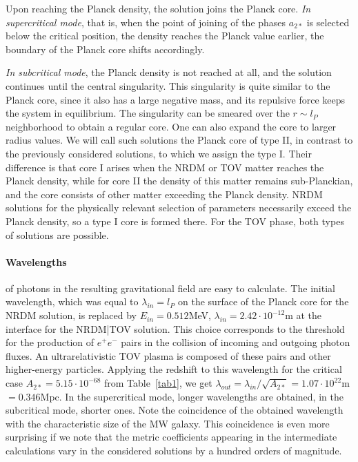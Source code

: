 \documentclass{article}
\begin{document}
Upon reaching the Planck density, the solution joins the Planck core. {\it In supercritical mode}, that is, when the point of joining of the phases $ a_ {2 *} $ is selected below the critical position, the density reaches the Planck value earlier, the boundary of the Planck core shifts accordingly.

{\it In subcritical mode}, the Planck density is not reached at all, and the solution continues until the central singularity. This singularity is quite similar to the Planck core, since it also has a large negative mass, and its repulsive force keeps the system in equilibrium. The singularity can be smeared over the $ r \sim l_P $ neighborhood to obtain a regular core. One can also expand the core to larger radius values. We will call such solutions the Planck core of type II, in contrast to the previously considered solutions, to which we assign the type I. Their difference is that core I arises when the NRDM or TOV matter reaches the Planck density, while for core II the density of this matter remains sub-Planckian, and the core consists of other matter exceeding the Planck density. NRDM solutions for the physically relevant selection of parameters necessarily exceed the Planck density, so a type I core is formed there. For the TOV phase, both types of solutions are possible.

\paragraph* {Wavelengths} of photons in the resulting gravitational field are easy to calculate. The initial wavelength, which was equal to $ \lambda_ {in} = l_P $ on the surface of the Planck core for the NRDM solution, is replaced by $ E_ {in} = 0.512 $MeV, $ \lambda_ {in} = 2.42 \cdot10 ^ {- 12 } $m at the interface for the NRDM|TOV solution. This choice corresponds to the threshold for the production of $ e ^ + e ^ - $ pairs in the collision of incoming and outgoing photon fluxes. An ultrarelativistic TOV plasma is composed of these pairs and other higher-energy particles. Applying the redshift to this wavelength for the critical case $A_{2*}=5.15\cdot10^{-68}$ from Table~\ref {tab1}, we get $ \lambda_ {out} = \lambda_ {in} / \sqrt {A_ {2 *}} = 1.07 \cdot10 ^ {22} $m $ = 0.346 $Mpc. In the supercritical mode, longer wavelengths are obtained, in the subcritical mode, shorter ones. Note the coincidence of the obtained wavelength with the characteristic size of the MW galaxy. This coincidence is even more surprising if we note that the metric coefficients appearing in the intermediate calculations vary in the considered solutions by a hundred orders of magnitude.
\end{document}
